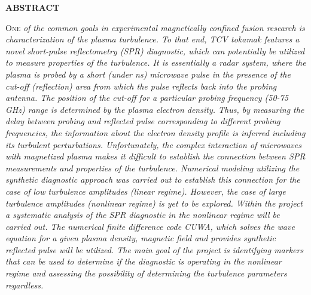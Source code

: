 \documentclass[11pt,a4paper,openany]{report}
\begin{document}
\begin{titlepage}
\begin{center}

    \end{center}

\end{titlepage}

\newpage
\begin{multicols}{2}
    \tableofcontents

\end{multicols}
\newpage


\begin{center}
    \textbf{ABSTRACT}
\end{center}
\fontsize{9}{10}\selectfont

\lettrine[loversize=.30,findent=.21em,nindent=2.5pt]{\color{black} O}{ne} \emph{of the common goals in experimental magnetically confined fusion research is characterization of the plasma turbulence. To that end, TCV tokamak features a novel short-pulse reflectometry (SPR) diagnostic, which can potentially be utilized to measure properties of the turbulence.
    It is essentially a radar system, where the plasma is probed by a short (under ns) microwave pulse in the presence of the cut-off (reflection) area from which the pulse reflects back into the probing antenna. The position of the cut-off for a particular probing frequency (50-75 GHz) range is determined by the plasma electron density. Thus, by measuring the delay between probing and reflected pulse corresponding to different probing frequencies, the information about the electron density profile is inferred including its turbulent perturbations.
    Unfortunately, the complex interaction of microwaves with magnetized plasma makes it difficult to establish the connection between SPR measurements and properties of the turbulence. Numerical modeling utilizing the synthetic diagnostic approach was carried out to establish this connection for the case of low turbulence amplitudes (linear regime). However, the case of large turbulence amplitudes (nonlinear regime) is yet to be explored.
    Within the project a systematic analysis of the SPR diagnostic in the nonlinear regime will be carried out. The numerical finite difference code CUWA, which solves the wave equation for a given plasma density, magnetic field and provides synthetic reflected pulse will be utilized. The main goal of the project is identifying markers that can be used to determine if the diagnostic is operating in the nonlinear regime and assessing the possibility of determining the turbulence parameters regardless.
}
\fontsize{10}{10}\selectfont
\end{document}
